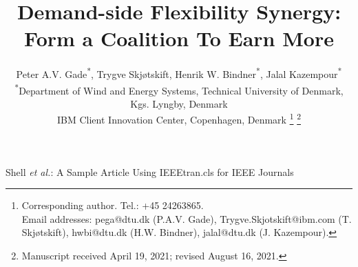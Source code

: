 \documentclass[lettersize,journal]{IEEEtran}
\begin{document}
\title{Demand-side Flexibility Synergy: Form a Coalition To Earn More}

\author{Peter A.V. Gade\textsuperscript{*}\textsuperscript{\textdagger}, Trygve Skjøtskift\textsuperscript{\textdagger}, Henrik W. Bindner\textsuperscript{*}, Jalal Kazempour\textsuperscript{*} \\
    \textsuperscript{*}Department of Wind and Energy Systems, Technical University of Denmark, Kgs. Lyngby, Denmark \\
    \textsuperscript{\textdagger}IBM Client Innovation Center, Copenhagen, Denmark
    \thanks{Corresponding author. Tel.: +45 24263865. \\ Email addresses: pega@dtu.dk (P.A.V. Gade), Trygve.Skjotskift@ibm.com (T. Skjøtskift), hwbi@dtu.dk (H.W. Bindner), jalal@dtu.dk (J. Kazempour).}%
    \thanks{Manuscript received April 19, 2021; revised August 16, 2021.}}


%
{Shell \MakeLowercase{\textit{et al.}}: A Sample Article Using IEEEtran.cls for IEEE Journals}


\maketitle

\end{document}
